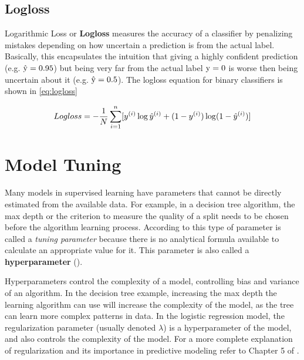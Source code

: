 \subsection{Logloss}

Logarithmic Loss or \textbf{Logloss} measures the accuracy of a classifier by penalizing mistakes depending on how uncertain a prediction is from the actual label. Basically, this encapsulates the intuition that giving a highly confident prediction (e.g. $\hat{{\text{\textup{y}}}} = 0.95$) but being very far from the actual label $\text{\textup{y}} = 0$ is worse then being uncertain about it (e.g.  $\hat{{\text{\textup{y}}}} = 0.5$). The logloss equation for binary classifiers is shown in \ref{eq:logloss}

\begin{equation}\label{eq:logloss}
    Logloss = -\frac{1}{N}\sum_{i=1}^{n}[y^{(i)} \log \hat{y}^{(i)} + (1 - y^{(i)})\log(1 - \hat{y}^{(i)})]
\end{equation}




\section{Model Tuning}

Many models in supervised learning have parameters that cannot be directly estimated from the available data. For example, in a decision tree algorithm, the max depth or the criterion to measure the quality of a split needs to be chosen before the algorithm learning process. According to \cite{kuhn2013applied} this type of parameter is called a \textit{tuning parameter} because there is no analytical formula available to calculate an appropriate value for it. This parameter is also called a \textbf{hyperparameter} (\cite{kuhn2013applied}). 

Hyperparameters control the complexity of a model, controlling bias and variance of an algorithm. In the decision tree example, increasing the max depth the learning algorithm can use will increase the complexity of the model, as the tree can learn more complex patterns in data. In the logistic regression model, the regularization parameter (usually denoted $\lambda$) is a hyperparameter of the model, and also controls the complexity of the model. For a more complete explanation of regularization and its importance in predictive modeling refer to Chapter 5 of \cite{hastie2009elements}.

